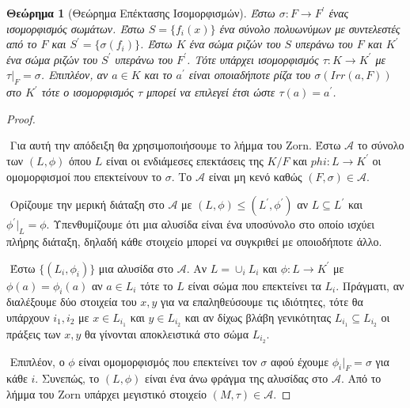 \documentclass[oneside,a4paper]{article}
\newtheorem{theorem}{Θεώρημα}
\newcommand {\tl}{\textlatin}
\begin{document}
\vspace{0.1cm}
\begin{theorem} [Θεώρημα Επέκτασης Ισομορφισμών]
	Έστω $\sigma : F \rightarrow F^{\prime}$ ένας ισομορφισμός σωμάτων. Έστω $S = \{f_i (x)\}$ ένα σύνολο πολυωνύμων με συντελεστές από το $F$ και $S^{\prime} = \{\sigma (f_i)\}$. Έστω $K$ ένα σώμα ριζών του $S$ υπεράνω του $F$ και $K^{\prime}$ ένα σώμα ριζών του $S^{\prime}$ υπεράνω του $F^{\prime}$. Τότε υπάρχει ισομορφισμός $\tau : K \rightarrow K^{\prime}$ με $\tau|_F = \sigma$. Επιπλέον, αν $a \in K$ και το $a^{\prime}$ είναι οποιαδήποτε ρίζα του $\sigma(Irr(a,F))$ στο $K^{\prime}$ τότε ο ισομορφισμός $\tau$ μπορεί να επιλεγεί έτσι ώστε $\tau(a) = a^{\prime}$.
\end{theorem}

\begin{proof} $ $

	$ $\newline
	Για αυτή την απόδειξη θα χρησιμοποιήσουμε το λήμμα του \tl{Zorn}. Έστω $\mathcal A$ το σύνολο των $(L,\phi)$ όπου $L$ είναι οι ενδιάμεσες επεκτάσεις της $K/F$ και $phi : L \rightarrow K^{\prime}$ οι ομομορφισμοί που επεκτείνουν το $\sigma$. Το $\mathcal A$ είναι μη κενό καθώς $(F,\sigma) \in \mathcal A$.

	$ $\newline
	Ορίζουμε την μερική διάταξη στο $\mathcal A$ με $(L,\phi) \leq (L^{\prime},\phi^{\prime})$ αν $L\subseteq L^{\prime}$ και $\phi^{\prime}|_L = \phi$. Υπενθυμίζουμε ότι μια αλυσίδα είναι ένα υποσύνολο στο οποίο ισχύει πλήρης διάταξη, δηλαδή κάθε στοιχείο μπορεί να συγκριθεί με οποιοδήποτε άλλο.

	$ $\newline
	Έστω $\{(L_i , \phi_i)\}$ μια αλυσίδα στο $\mathcal A$. Αν $L = \cup_i L_i$ και $\phi : L \rightarrow K^{\prime}$ με $\phi(a) = \phi_i (a)$ αν $a \in L_i$ τότε το $L$ είναι σώμα που επεκτείνει τα $L_i$. Πράγματι, αν διαλέξουμε δύο στοιχεία του $x,y$ για να επαληθεύσουμε τις ιδιότητες, τότε θα υπάρχουν $i_1 , i_2$ με $x \in L_{i_1}$ και $y \in L_{i_2}$ και αν δίχως βλάβη γενικότητας $L_{i_1} \subseteq L_{i_2}$ οι πράξεις των $x,y$ θα γίνονται αποκλειστικά στο σώμα $L_{i_2}$.

	$ $\newline
	Επιπλέον, ο $\phi$ είναι ομομορφισμός που επεκτείνει τον $\sigma$ αφού έχουμε $\phi_i|_F = \sigma$ για κάθε $i$. Συνεπώς, το $(L,\phi)$ είναι ένα άνω φράγμα της αλυσίδας στο $\mathcal A$. Από το λήμμα του \tl{Zorn} υπάρχει μεγιστικό στοιχείο $(M,\tau) \in \mathcal A$.


\end{proof}
\end{document}
